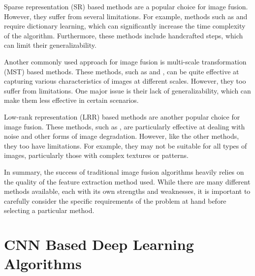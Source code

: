 Sparse representation (SR)\cite{liu2017infrared}  based methods are a popular choice for image fusion. However, they suffer from several limitations. For example, methods such as \cite{bin2016efficient} and \cite{zhang2013dictionary} require dictionary learning, which can significantly increase the time complexity of the algorithm. Furthermore, these methods include handcrafted steps, which can limit their generalizability.

Another commonly used approach for image fusion is multi-scale transformation (MST) based methods. These methods, such as \cite{hu2017adaptive} and \cite{he2017infrared}, can be quite effective at capturing various characteristics of images at different scales. However, they too suffer from limitations. One major issue is their lack of generalizability, which can make them less effective in certain scenarios.

Low-rank representation (LRR) based methods are another popular choice for image fusion. These methods, such as \cite{liu2012robust}, are particularly effective at dealing with noise and other forms of image degradation. However, like the other methods, they too have limitations. For example, they may not be suitable for all types of images, particularly those with complex textures or patterns.

In summary, the success of traditional image fusion algorithms heavily relies on the quality of the feature extraction method used. While there are many different methods available, each with its own strengths and weaknesses, it is important to carefully consider the specific requirements of the problem at hand before selecting a particular method.

\section{CNN Based Deep Learning Algorithms}


